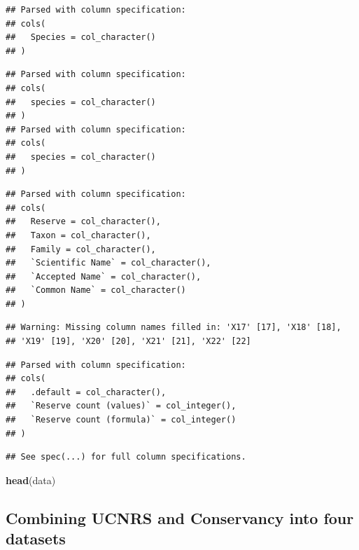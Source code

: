 \documentclass[]{article}
\newenvironment{Shaded}{\begin{snugshade}}{\end{snugshade}}
\newcommand{\KeywordTok}[1]{\textcolor[rgb]{0.13,0.29,0.53}{\textbf{#1}}}
\newcommand{\NormalTok}[1]{#1}
\begin{document}
\begin{verbatim}
## Parsed with column specification:
## cols(
##   Species = col_character()
## )
\end{verbatim}

\begin{verbatim}
## Parsed with column specification:
## cols(
##   species = col_character()
## )
## Parsed with column specification:
## cols(
##   species = col_character()
## )
\end{verbatim}

\begin{verbatim}
## Parsed with column specification:
## cols(
##   Reserve = col_character(),
##   Taxon = col_character(),
##   Family = col_character(),
##   `Scientific Name` = col_character(),
##   `Accepted Name` = col_character(),
##   `Common Name` = col_character()
## )
\end{verbatim}

\begin{verbatim}
## Warning: Missing column names filled in: 'X17' [17], 'X18' [18],
## 'X19' [19], 'X20' [20], 'X21' [21], 'X22' [22]
\end{verbatim}

\begin{verbatim}
## Parsed with column specification:
## cols(
##   .default = col_character(),
##   `Reserve count (values)` = col_integer(),
##   `Reserve count (formula)` = col_integer()
## )
\end{verbatim}

\begin{verbatim}
## See spec(...) for full column specifications.
\end{verbatim}

\begin{Shaded}
\begin{Highlighting}[]
\KeywordTok{head}\NormalTok{(data)}
\end{Highlighting}
\end{Shaded}

\subsection{Combining UCNRS and Conservancy into four
datasets}\label{combining-ucnrs-and-conservancy-into-four-datasets}
\end{document}
